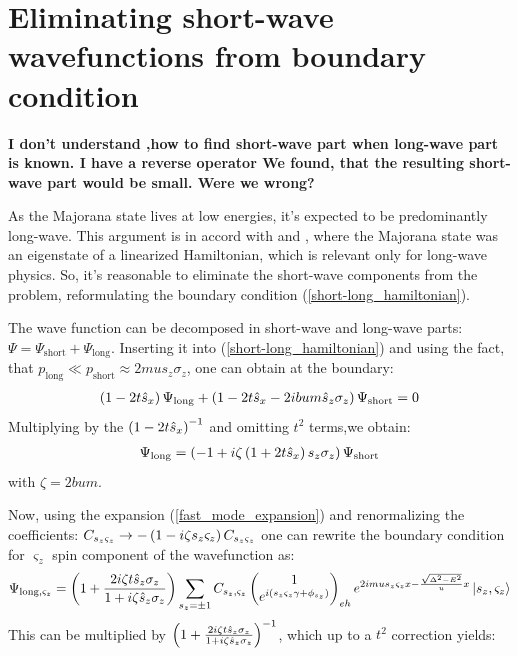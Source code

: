 \section{Eliminating short-wave wavefunctions from boundary condition}
\label{sec:elimintaing_long-wave}
\textbf{I don't understand ,how to find short-wave part when long-wave part is known. I have a reverse operator We found, that the resulting short-wave part would be small. Were we wrong?}

	As the Majorana state lives at low energies, it's expected to be predominantly long-wave. This argument is in accord with \cite{Oreg_2010} and \cite{Lutchyn_2010}, where the Majorana state was an eigenstate of a linearized Hamiltonian, which is relevant only for long-wave physics. So, it's reasonable to eliminate the short-wave components from the problem, reformulating the boundary condition (\ref{short-long_hamiltonian}).

The wave function can be decomposed in short-wave and  long-wave  parts: $ \Psi = \Psi_{\mathrm{short}}+\Psi_{\mathrm{long}} $. Inserting it into (\ref{short-long_hamiltonian}) and using the fact, that $ p_{\mathrm{
long}}\ll p_{\mathrm{short}} \approx 2mu s_z \sigma_z $, one can obtain at the boundary:
\begin{gather}
	\left(1-2t\hat{s}_x\right)\Psi_{\mathrm{long}}+\left(1-2t\hat{s}_x-2ibum\hat{s}_z \sigma_z\right)\Psi_{\mathrm{short}}=0
\end{gather}
Multiplying by the $ \left(1-2t\hat{s}_x\right)^{-1} $ and omitting $ {t^2} $ terms,we obtain:
\begin{gather}
	\Psi_{\mathrm{long}}
	=
	\left(-1+i\zeta\left(1+2t\hat{s}_x\right)s_z \sigma_z\right)\Psi_{\mathrm{short}}
\end{gather}
with $ \zeta=2bum $.

Now, using the expansion (\ref{fast_mode_expansion}) and renormalizing the coefficients: $ C_{s_z \varsigma_z}\to-\left(1-i\zeta s_z \varsigma_z\right)C_{s_z \varsigma_z} $ one can rewrite the boundary condition for $ \varsigma_z $ spin component of the wavefunction as:
\begin{gather}
\Psi_{\mathrm{long},\varsigma_z}
=
\left(1+\frac{2i\zeta t\hat{s}_z\sigma_z}{1+i\zeta \hat{s}_z\sigma_z}\right)
\sum_{s_z=\pm1}
C_{s_z,\varsigma_z}
		\begin{pmatrix}
	1
	\\
	e^{i\left(s_z\varsigma_z\gamma+\phi_{s_z}\right)}
	\end{pmatrix}_{eh}
	e^{2imus_z\varsigma_zx -\frac{\sqrt{\Delta^2-E^2}}{u}x}
	\ket{s_z, \varsigma_z}
\end{gather}
This can be  multiplied by $ \left(1+\frac{2i\zeta t\hat{s}_z\sigma_z}{1+i\zeta \hat{s}_z\sigma_z}\right)^{-1} $, which up to a $ t^2 $ correction yields:

